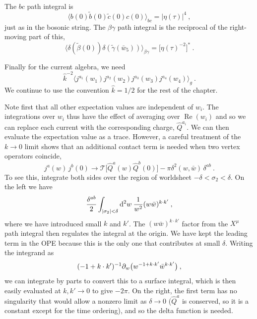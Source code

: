 \noindent The $bc$ path integral is
\begin{equation}
	\langle b(0)\tilde{b}(0)\tilde{c}(0)c(0)\rangle_{bc} = |\eta(\tau)|^4 \:, \label{12.6.7}
\end{equation}
just as in the bosonic string. The $\beta\gamma$ path integral is the reciprocal of the right-moving part of this,
\begin{equation}
	\langle \delta(\tilde{\beta}(0))\delta(\tilde{\gamma}(\bar{w}_5))\rangle_{\beta\gamma} = \bigl[\eta(\tau)^{-2}\bigr]^* \:. \label{12.6.8}
\end{equation}

Finally for the current algebra, we need
\begin{equation}
	\hat{k}^{-2}\langle j^{a_1}(w_1)j^{a_2}(w_2)j^{a_3}(w_3)j^{a_4}(w_4)\rangle_g \:. \label{12.6.9}
\end{equation}
We continue to use the convention $\hat{k} = 1/2$ for the rest of the chapter.

Note first that all other expectation values are independent of $w_i$. The integrations over $w_i$ thus have the effect of averaging over $\operatorname{Re}(w_i)$ and so we can replace each current with the corresponding charge, $\hat{Q}^{a_i}$. We can then evaluate the expectation value as a trace. However, a careful treatment of the $k \to 0$ limit shows that an additional contact term is needed when two vertex operators coincide,
\begin{equation}
	j^a(w)\,j^b(0) \longrightarrow \mathcal{T}\bigl[\hat{Q}^a(w)\hat{Q}^b(0)\bigr] - \pi\delta^2(w,\bar{w})\,\delta^{ab} \:. \label{12.6.10}
\end{equation}
To see this, integrate both sides over the region of worldsheet $-\delta < \sigma_2 < \delta$. On the left we have
\begin{equation}
	\frac{\delta^{ab}}{2}\int_{|\sigma_2|<\delta}\mathrm{d}^2 w\:\frac{1}{w^2}(w\bar{w})^{k\cdot k'} \:, \label{12.6.11}
\end{equation}
where we have introduced small $k$ and $k'$. The $(w\bar{w})^{k\cdot k'}$ factor from the $X^\mu$ path integral then regulates the integral at the origin. We have kept the leading term in the OPE because this is the only one that contributes at small $\delta$. Writing the integrand as
\begin{equation}
	(-1 + k\cdot k')^{-1}\partial_w\bigl(w^{-1+k\cdot k'}\bar{w}^{k\cdot k'}\bigr) \:, \label{12.6.12}
\end{equation}
we can integrate by parts to convert this to a surface integral, which is then easily evaluated at $k,k' \to 0$ to give $-2\pi$. On the right, the first term has no singularity that would allow a nonzero limit as $\delta \to 0$ ($\hat{Q}^a$ is conserved, so it is a constant except for the time ordering), and so the delta function is needed.

